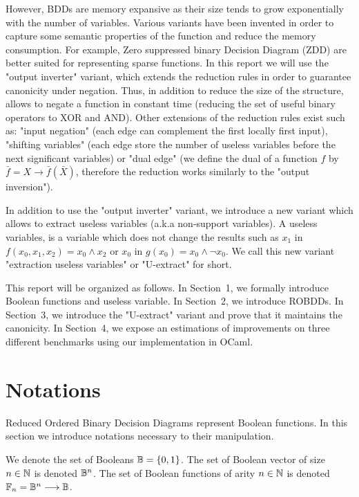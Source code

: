 \documentclass[a4paper,10pt]{article}
\begin{document}
However, BDDs are memory expansive as their size tends to grow exponentially with the number of variables.
Various variants have been invented in order to capture some semantic properties of the function and reduce the memory consumption.
For example, Zero suppressed binary Decision Diagram (ZDD) are better suited for representing sparse functions.
In this report we will use the "output inverter" variant\cite{BryantVariantN}, which extends the reduction rules in order to guarantee canonicity under negation.
Thus, in addition to reduce the size of the structure, allows to negate a function in constant time (reducing the set of useful binary operators to XOR and AND).
Other extensions of the reduction rules exist such as: "input negation"\cite{MinatoVariants} (each edge can complement the first locally first input), "shifting variables"\cite{MinatoVariants} (each edge store the number of useless variables before the next significant variables) or "dual edge"\cite{RolfVariantDual} (we define the dual of a function $f$ by $\bar{f} = X \longrightarrow \bar{f}(\bar{X})$, therefore the reduction works similarly to the "output inversion").


In addition to use the "output inverter" variant, we introduce a new variant which allows to extract useless variables (a.k.a non-support variables).
A useless variables, is a variable which does not change the results such as $x_1$ in $f(x_0, x_1, x_2) = x_0 \land x_2$ or $x_0$ in $g(x_0) = x_0 \land \lnot x_0$.
We call this new variant "extraction useless variables" or "U-extract" for short.


This report will be organized as follows. In Section~1, we formally introduce Boolean functions and useless variable. In Section~2, we introduce ROBDDs. In Section~3, we introduce the "U-extract" variant and prove that it maintains the canonicity. In Section~4, we expose an estimations of improvements on three different benchmarks \cite{BenchSatlib, BenchLgsynth91, BenchIscas99} using our implementation in OCaml.

\section{Notations}

Reduced Ordered Binary Decision Diagrams represent Boolean functions.
In this section we introduce notations necessary to their manipulation.


We denote the set of Booleans $\mathbb{B} = \{0, 1\}$.
The set of Boolean vector of size $n\in\mathbb{N}$ is denoted $\mathbb{B}^n$.
The set of Boolean functions of arity $n\in\mathbb{N}$ is denoted $\mathbb{F}_n = \mathbb{B}^n \longrightarrow \mathbb{B}$.
\end{document}
